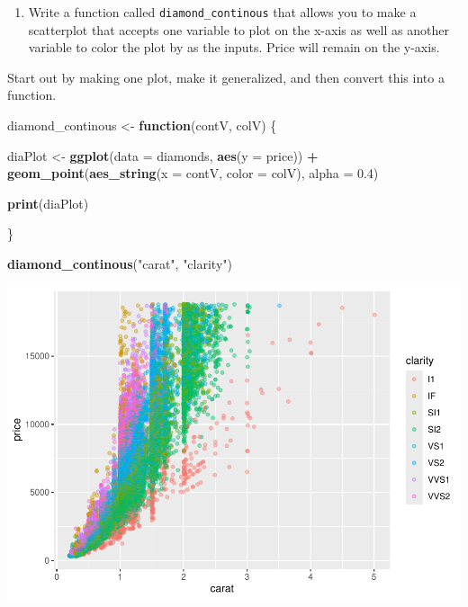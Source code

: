 \documentclass[
]{book}
\newenvironment{Shaded}{\begin{snugshade}}{\end{snugshade}}
\newcommand{\AttributeTok}[1]{\textcolor[rgb]{0.13,0.29,0.53}{#1}}
\newcommand{\ControlFlowTok}[1]{\textcolor[rgb]{0.13,0.29,0.53}{\textbf{#1}}}
\newcommand{\FloatTok}[1]{\textcolor[rgb]{0.00,0.00,0.81}{#1}}
\newcommand{\FunctionTok}[1]{\textcolor[rgb]{0.13,0.29,0.53}{\textbf{#1}}}
\newcommand{\NormalTok}[1]{#1}
\newcommand{\OtherTok}[1]{\textcolor[rgb]{0.56,0.35,0.01}{#1}}
\newcommand{\SpecialCharTok}[1]{\textcolor[rgb]{0.81,0.36,0.00}{\textbf{#1}}}
\newcommand{\StringTok}[1]{\textcolor[rgb]{0.31,0.60,0.02}{#1}}
\providecommand{\tightlist}{%
  \setlength{\itemsep}{0pt}\setlength{\parskip}{0pt}}
\begin{document}
\begin{enumerate}
\def\labelenumi{\arabic{enumi}.}
\setcounter{enumi}{3}
\tightlist
\item
  Write a function called \texttt{diamond\_continous} that allows you to make a scatterplot that accepts one variable to plot on the x-axis as well as another variable to color the plot by as the inputs. Price will remain on the y-axis.
\end{enumerate}

Start out by making one plot, make it generalized, and then convert this into a function.

\begin{Shaded}
\begin{Highlighting}[]
\NormalTok{diamond\_continous }\OtherTok{\textless{}{-}} \ControlFlowTok{function}\NormalTok{(contV, colV) \{}
  
\NormalTok{  diaPlot }\OtherTok{\textless{}{-}} \FunctionTok{ggplot}\NormalTok{(}\AttributeTok{data =}\NormalTok{ diamonds, }\FunctionTok{aes}\NormalTok{(}\AttributeTok{y =}\NormalTok{ price)) }\SpecialCharTok{+} 
    \FunctionTok{geom\_point}\NormalTok{(}\FunctionTok{aes\_string}\NormalTok{(}\AttributeTok{x =}\NormalTok{ contV, }\AttributeTok{color =}\NormalTok{ colV), }\AttributeTok{alpha =} \FloatTok{0.4}\NormalTok{)}
  
  \FunctionTok{print}\NormalTok{(diaPlot)}
  
\NormalTok{\}}

\FunctionTok{diamond\_continous}\NormalTok{(}\StringTok{"carat"}\NormalTok{, }\StringTok{"clarity"}\NormalTok{)}
\end{Highlighting}
\end{Shaded}

\includegraphics{_main_files/figure-latex/unnamed-chunk-109-1.pdf}
\end{document}
